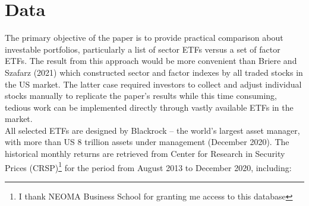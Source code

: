 \section{Data}

The primary objective of the paper is to provide practical comparison about investable portfolios, particularly a list of sector ETFs versus a set of factor ETFs. The result from this approach would be more convenient than Briere and Szafarz (2021) which constructed sector and factor indexes by all traded stocks in the US market. The latter case required investors to collect and adjust individual stocks manually to replicate the paper’s results while this time consuming, tedious work can be implemented directly through vastly available ETFs in the market.\\
All selected ETFs are designed by Blackrock – the world’s largest asset manager, with more than US 8 trillion assets under management (December 2020). The historical monthly returns are retrieved from Center for Research in Security Prices (CRSP)\footnote{I thank NEOMA Business School for granting me access to this database}  for the period from August 2013 to December 2020, including:
